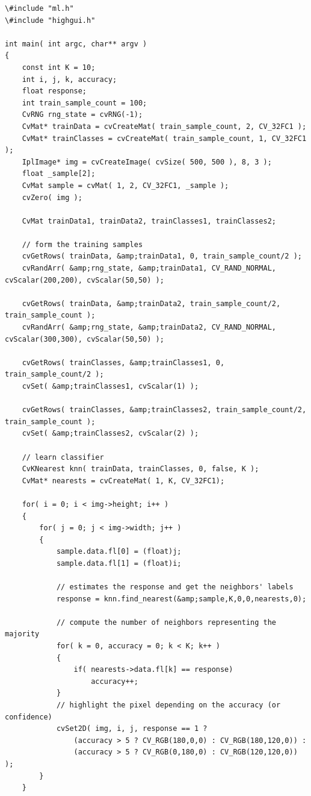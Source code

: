 \begin{lstlisting}
\#include "ml.h"
\#include "highgui.h"

int main( int argc, char** argv )
{
    const int K = 10;
    int i, j, k, accuracy;
    float response;
    int train_sample_count = 100;
    CvRNG rng_state = cvRNG(-1);
    CvMat* trainData = cvCreateMat( train_sample_count, 2, CV_32FC1 );
    CvMat* trainClasses = cvCreateMat( train_sample_count, 1, CV_32FC1 );
    IplImage* img = cvCreateImage( cvSize( 500, 500 ), 8, 3 );
    float _sample[2];
    CvMat sample = cvMat( 1, 2, CV_32FC1, _sample );
    cvZero( img );

    CvMat trainData1, trainData2, trainClasses1, trainClasses2;

    // form the training samples
    cvGetRows( trainData, &amp;trainData1, 0, train_sample_count/2 );
    cvRandArr( &amp;rng_state, &amp;trainData1, CV_RAND_NORMAL, cvScalar(200,200), cvScalar(50,50) );

    cvGetRows( trainData, &amp;trainData2, train_sample_count/2, train_sample_count );
    cvRandArr( &amp;rng_state, &amp;trainData2, CV_RAND_NORMAL, cvScalar(300,300), cvScalar(50,50) );

    cvGetRows( trainClasses, &amp;trainClasses1, 0, train_sample_count/2 );
    cvSet( &amp;trainClasses1, cvScalar(1) );

    cvGetRows( trainClasses, &amp;trainClasses2, train_sample_count/2, train_sample_count );
    cvSet( &amp;trainClasses2, cvScalar(2) );

    // learn classifier
    CvKNearest knn( trainData, trainClasses, 0, false, K );
    CvMat* nearests = cvCreateMat( 1, K, CV_32FC1);

    for( i = 0; i < img->height; i++ )
    {
        for( j = 0; j < img->width; j++ )
        {
            sample.data.fl[0] = (float)j;
            sample.data.fl[1] = (float)i;

            // estimates the response and get the neighbors' labels
            response = knn.find_nearest(&amp;sample,K,0,0,nearests,0);

            // compute the number of neighbors representing the majority
            for( k = 0, accuracy = 0; k < K; k++ )
            {
                if( nearests->data.fl[k] == response)
                    accuracy++;
            }
            // highlight the pixel depending on the accuracy (or confidence)
            cvSet2D( img, i, j, response == 1 ?
                (accuracy > 5 ? CV_RGB(180,0,0) : CV_RGB(180,120,0)) :
                (accuracy > 5 ? CV_RGB(0,180,0) : CV_RGB(120,120,0)) );
        }
    }


\end{lstlisting}
